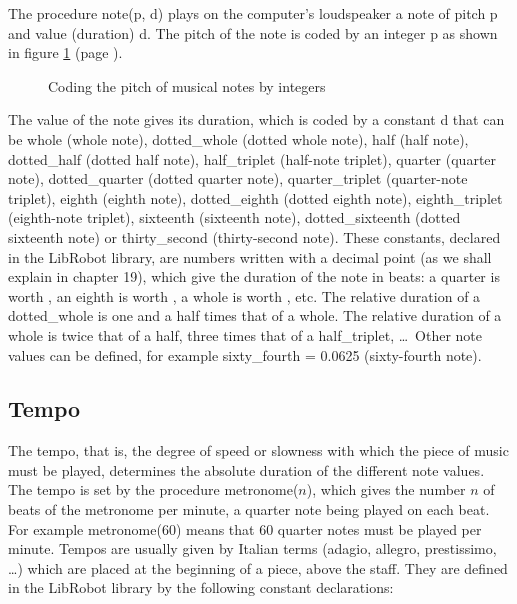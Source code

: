 The procedure {\idt note(p, d)} plays
on the computer's loudspeaker a note of pitch {\idt p} and
value (duration) {\idt d}. The pitch of the note is coded by an integer {\idt p} as shown in figure
\ref{fig:codenotes} (page \pageref{fig:codenotes}).
\begin{figure}[htbp]
 
 \caption{Coding the pitch of musical notes by integers}\label{fig:codenotes}
\end{figure}
The value of the note gives its duration, which is coded by a constant {\idt d} that can be {\idt whole} (whole note),
{\idt dotted\_whole} (dotted whole note),
{\idt half} (half note),
{\idt dotted\_half} (dotted half note),
{\idt half\_triplet} (half-note triplet),
{\idt quarter} (quarter note),
{\idt dot\-ted\_\-quar\-ter} (dotted quarter note),
{\idt quar\-ter\_\-trip\-let} (quarter-note triplet),
 {\idt eighth} (eighth note),
 {\idt dotted\_eighth} (dotted eighth note),
{\idt eighth\_\-trip\-let} (eighth-note triplet),
{\idt sixteenth} (sixteenth note),
{\idt dot\-ted\_\-six\-teenth} (dotted sixteenth note) or
{\idt thir\-ty\_\-sec\-ond} (thirty-second note). These constants, declared in the {\idt LibRobot} library,
are numbers written with a decimal point (as we shall explain in chapter 19), which
give the duration of the note in beats: a {\idt quarter} is worth {},
an {\idt eighth} is worth {}, a {\idt whole} is worth {}, etc.
The relative duration of a {\idt dot\-ted\_\-whole} is
one and a half times that of a
 {\idt whole}. The relative duration of a {\idt whole} is twice that of a
 {\idt half}, three times that of a {\idt half\_\-trip\-let}, \ldots\
Other note values can be defined, for example
{\idt sixty\_fourth = 0.0625} (sixty-fourth note).

 \subsection{Tempo}

 The tempo,
 that is, the degree of speed or slowness with which the piece of music must be played,
 determines the absolute duration of the different note values. The tempo is set
 by the procedure {\idt metronome($n$)}, which gives the number $n$ of beats of the
 metronome per minute, a quarter note being played on each beat. For example
 {\idt metronome(60)} means that 60 quarter notes must be played per minute. Tempos
 are usually given by Italian terms (adagio, allegro, prestissimo, \ldots) which
 are placed at the beginning of a piece, above the staff. They are defined
 in the {\idt LibRobot} library by the following constant declarations:

